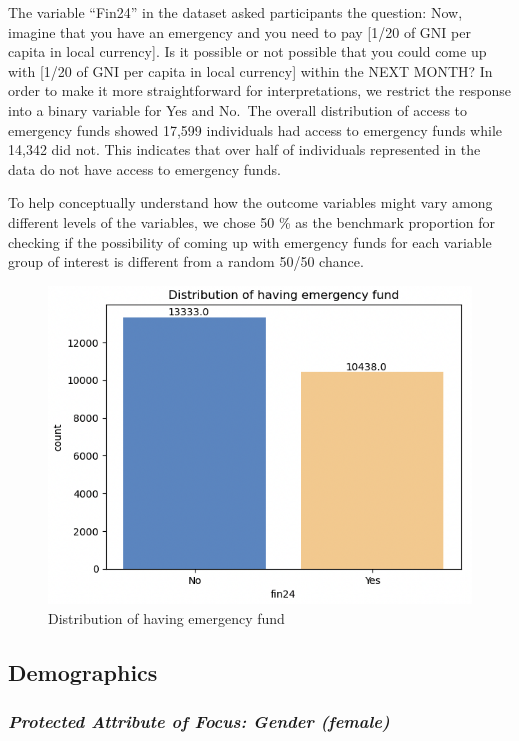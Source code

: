 \documentclass[12pt]{article}
\begin{document}
The variable ``Fin24'' in the dataset asked participants the question:
Now, imagine that you have an emergency and you need to pay {[}1/20 of
GNI per capita in local currency{]}. Is it possible or not possible that
you could come up with {[}1/20 of GNI per capita in local currency{]}
within the NEXT MONTH\citep{Demirguc-Kunt2022}? In order to make it more
straightforward for interpretations, we restrict the response into a
binary variable for Yes and No.~The overall distribution of access to
emergency funds showed 17,599 individuals had access to emergency funds
while 14,342 did not. This indicates that over half of individuals
represented in the data do not have access to emergency funds.

To help conceptually understand how the outcome variables might vary
among different levels of the variables, we chose 50 \% as the benchmark
proportion for checking if the possibility of coming up with emergency
funds for each variable group of interest is different from a random
50/50 chance.

\begin{figure}

{\centering \includegraphics[width=0.7\linewidth]{graphs/f24_graph1} 

}

\caption{Distribution of having emergency fund}\label{fig:unnamed-chunk-4}
\end{figure}

\hypertarget{demographics}{%
\subsection{Demographics}\label{demographics}}

\hypertarget{protected-attribute-of-focus-gender-female}{%
\subsubsection{\texorpdfstring{\emph{Protected Attribute of Focus:
Gender
(female)}}{Protected Attribute of Focus: Gender (female)}}\label{protected-attribute-of-focus-gender-female}}
\end{document}
